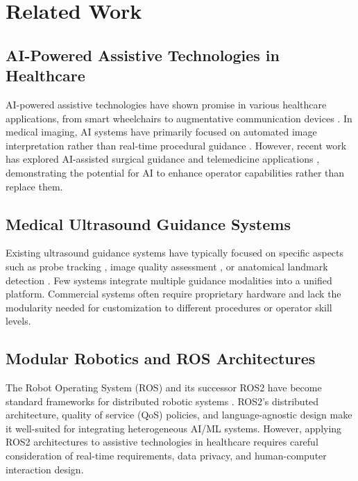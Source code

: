 \documentclass[12pt,a4paper]{article}
\begin{document}
\section{Related Work}

\subsection{AI-Powered Assistive Technologies in Healthcare}

AI-powered assistive technologies have shown promise in various healthcare applications, from smart wheelchairs to augmentative communication devices \cite{assistive_tech_review}. In medical imaging, AI systems have primarily focused on automated image interpretation rather than real-time procedural guidance \cite{medical_ai_review}. However, recent work has explored AI-assisted surgical guidance \cite{surgical_guidance} and telemedicine applications \cite{telemedicine_ai}, demonstrating the potential for AI to enhance operator capabilities rather than replace them.

\subsection{Medical Ultrasound Guidance Systems}

Existing ultrasound guidance systems have typically focused on specific aspects such as probe tracking \cite{probe_tracking}, image quality assessment \cite{image_quality}, or anatomical landmark detection \cite{landmark_detection}. Few systems integrate multiple guidance modalities into a unified platform. Commercial systems often require proprietary hardware and lack the modularity needed for customization to different procedures or operator skill levels.

\subsection{Modular Robotics and ROS Architectures}

The Robot Operating System (ROS) and its successor ROS2 have become standard frameworks for distributed robotic systems \cite{ros2_paper}. ROS2's distributed architecture, quality of service (QoS) policies, and language-agnostic design make it well-suited for integrating heterogeneous AI/ML systems. However, applying ROS2 architectures to assistive technologies in healthcare requires careful consideration of real-time requirements, data privacy, and human-computer interaction design.
\end{document}
